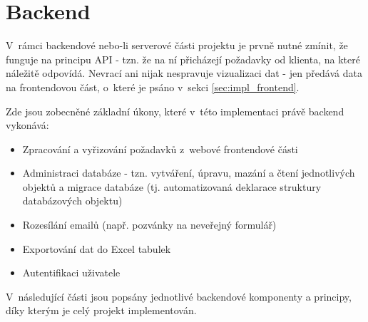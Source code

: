 \section{Backend}\label{sec:impl_backend}
	V~rámci backendové nebo-li serverové části projektu je prvně nutné zmínit, že funguje na principu API - tzn. že na ní přicházejí požadavky od klienta, na které náležitě odpovídá. Nevrací ani nijak nespravuje vizualizaci dat - jen předává data na frontendovou část, o~které je psáno v~sekci \ref{sec:impl_frontend}.
	
	Zde jsou zobecněné základní úkony, které v~této implementaci právě backend vykonává:
	
	\begin{itemize}
		\item Zpracování a vyřizování požadavků z~webové frontendové části
		\item Administraci databáze - tzn. vytváření, úpravu, mazání a čtení jednotlivých objektů a migrace databáze (tj. automatizovaná deklarace struktury databázových objektu)
		\item Rozesílání emailů (např. pozvánky na neveřejný formulář)
		\item Exportování dat do Excel tabulek
		\item Autentifikaci uživatele
	\end{itemize}
	 
	V~následující části jsou popsány jednotlivé backendové komponenty a principy, díky kterým je celý projekt implementován.
	
